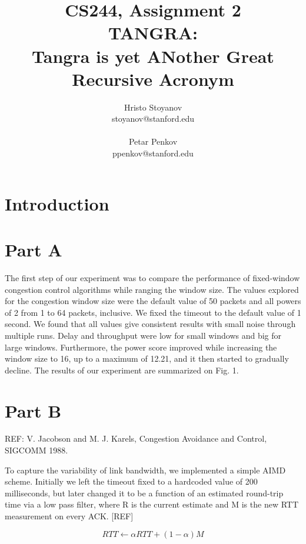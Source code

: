 \documentclass[12pt]{article}
\begin{document}
 
\title{CS244, Assignment 2\\TANGRA:\\ Tangra is yet ANother Great Recursive
Acronym}
\author{Hristo Stoyanov\\
stoyanov@stanford.edu\\
\\
Petar Penkov\\
ppenkov@stanford.edu}
 
\maketitle

\section*{Introduction}

\section*{Part A}

The first step of our experiment was to compare the performance of fixed-window
congestion control algorithms while ranging the window size. The values explored
for the congestion window size were the default value of 50 packets and all
powers of 2 from 1 to 64 packets, inclusive. We fixed the timeout to the default
value of 1 second. We found that all values give consistent results with small
noise through multiple runs. Delay and throughput were low for small windows and
big for large windows. Furthermore, the power score improved while increasing
the window size to 16, up to a maximum of 12.21, and it then started to
gradually decline. The results of our experiment are summarized on Fig. 1.

\section*{Part B}

REF: V. Jacobson and M. J. Karels, Congestion Avoidance and Control, SIGCOMM 1988.

To capture the variability of link bandwidth, we implemented a simple AIMD
scheme.  Initially we left the timeout fixed to a hardcoded value of 200
milliseconds, but later changed it to be a function of an estimated round-trip
time via a low pass filter, where R is the current estimate and M is the new RTT
measurement on every ACK. [REF]

$${RTT} \leftarrow \alpha {RTT} + \left(1 - \alpha\right)M$$
\end{document}
